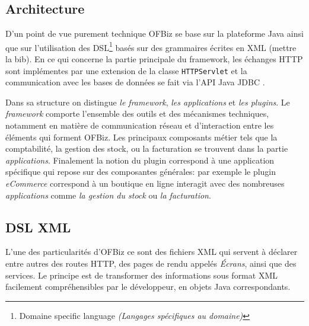 \subsection{Architecture }
D'un point de vue purement technique OFBiz se base sur la plateforme Java ainsi que sur l'utilisation des DSL\footnote{Domaine specific language \emph{(Langages spécifiques au domaine)}} basés sur des grammaires écrites en XML (mettre la bib). En ce qui concerne la partie principale du framework, les échanges HTTP sont implémentes par une extension de la classe \verb=HTTPServlet= \cite{chan2017servlet} et la communication avec les bases de données se fait via l'API Java JDBC \cite{JDBC}.

Dans sa structure on distingue \emph{le framework}, \emph{les applications} et \emph{les plugins}. Le \emph{framework} comporte l'ensemble des outils et des mécanismes techniques, notamment en matière de  communication réseau et d'interaction entre les éléments qui forment OFBiz.
Les principaux composants métier tels que la comptabilité, la gestion des stock, ou la facturation se trouvent dans la partie \emph{applications}. 
Finalement la notion du plugin correspond à une application spécifique qui repose sur des composantes générales: par exemple le plugin \emph{eCommerce} correspond à un boutique en ligne interagit avec des nombreuses  \emph{applications} comme \emph{la gestion du stock} ou \emph{la facturation}. 

\subsection{DSL XML}
L'une des particularités d'OFBiz ce sont des fichiers XML qui servent à déclarer entre autres
des routes HTTP, des pages de rendu appelés \emph{Écrans}, ainsi que des services. Le principe est de transformer des informations sous format XML facilement compréhensibles par le développeur, en objets Java correspondants. 



